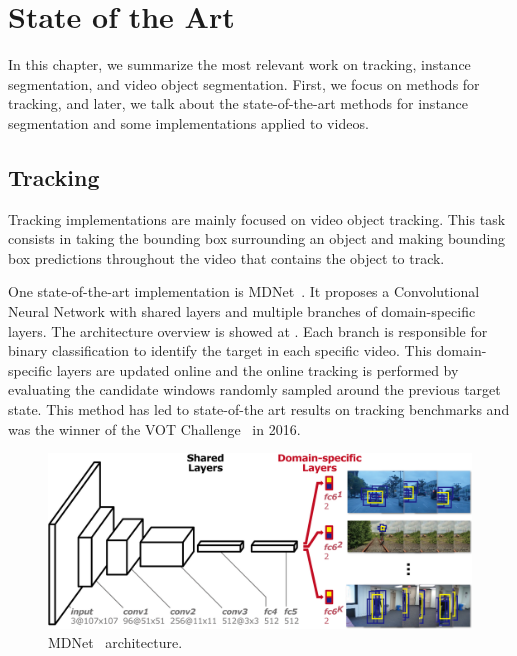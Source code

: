 
\chapter{State of the Art}
\label{cha:stateofart}

In this chapter, we summarize the most relevant work on tracking, instance segmentation, and video object segmentation.
First, we focus on methods for tracking, and later, we talk about the state-of-the-art methods for instance segmentation and some implementations applied to videos.

\section{Tracking}
\label{sec:soa_tracking}

Tracking implementations are mainly focused on video object tracking.
This task consists in taking the bounding box surrounding an object and making bounding box predictions throughout the video that contains the object to track.

One state-of-the-art implementation is MDNet~\mdnet{}.
It proposes a Convolutional Neural Network with shared layers and multiple branches of domain-specific layers.
The architecture overview is showed at .
Each branch is responsible for binary classification to identify the target in each specific video.
This domain-specific layers are updated online and the online tracking is performed by evaluating the candidate windows randomly sampled around the previous target state.
This method has led to state-of-the art results on tracking benchmarks and was the winner of the VOT Challenge~\votchallenge{} in 2016.

\begin{figure}[h]
  \centering
  \includegraphics[width=.8\linewidth]{figures/mdnet/architecture.png}
  \caption{MDNet~\mdnet{} architecture. }
  \label{fig:stateofart:mdnet}
\end{figure}

